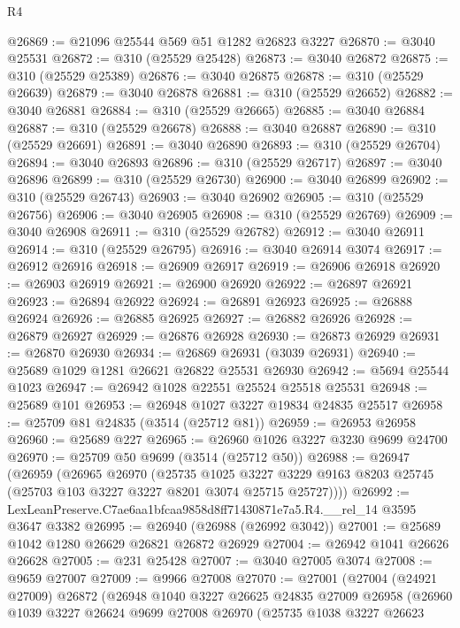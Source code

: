 \begin{lexlean}{R4}
\begin{coremodule}
@26869 := @21096 @25544 @569 @51 @1282 @26823 @3227
@26870 := @3040 @25531
@26872 := @310 (@25529 @25428)
@26873 := @3040 @26872
@26875 := @310 (@25529 @25389)
@26876 := @3040 @26875
@26878 := @310 (@25529 @26639)
@26879 := @3040 @26878
@26881 := @310 (@25529 @26652)
@26882 := @3040 @26881
@26884 := @310 (@25529 @26665)
@26885 := @3040 @26884
@26887 := @310 (@25529 @26678)
@26888 := @3040 @26887
@26890 := @310 (@25529 @26691)
@26891 := @3040 @26890
@26893 := @310 (@25529 @26704)
@26894 := @3040 @26893
@26896 := @310 (@25529 @26717)
@26897 := @3040 @26896
@26899 := @310 (@25529 @26730)
@26900 := @3040 @26899
@26902 := @310 (@25529 @26743)
@26903 := @3040 @26902
@26905 := @310 (@25529 @26756)
@26906 := @3040 @26905
@26908 := @310 (@25529 @26769)
@26909 := @3040 @26908
@26911 := @310 (@25529 @26782)
@26912 := @3040 @26911
@26914 := @310 (@25529 @26795)
@26916 := @3040 @26914 @3074
@26917 := @26912 @26916
@26918 := @26909 @26917
@26919 := @26906 @26918
@26920 := @26903 @26919
@26921 := @26900 @26920
@26922 := @26897 @26921
@26923 := @26894 @26922
@26924 := @26891 @26923
@26925 := @26888 @26924
@26926 := @26885 @26925
@26927 := @26882 @26926
@26928 := @26879 @26927
@26929 := @26876 @26928
@26930 := @26873 @26929
@26931 := @26870 @26930
@26934 := @26869 @26931 (@3039 @26931)
@26940 := @25689 @1029 @1281 @26621 @26822 @25531 @26930
@26942 := @5694 @25544 @1023
@26947 := @26942 @1028 @22551 @25524 @25518 @25531
@26948 := @25689 @101
@26953 := @26948 @1027 @3227 @19834 @24835 @25517
@26958 := @25709 @81 @24835 (@3514 (@25712 @81))
@26959 := @26953 @26958
@26960 := @25689 @227
@26965 := @26960 @1026 @3227 @3230 @9699 @24700
@26970 := @25709 @50 @9699 (@3514 (@25712 @50))
@26988 := @26947
    (@26959
      (@26965
        @26970
        (@25735
          @1025
          @3227
          @3229
          @9163
          @8203
          @25745
          (@25703 @103 @3227 @3227 @8201 @3074 @25715 @25727))))
@26992 := LexLeanPreserve.C7ae6aa1bfcaa9858d8ff71430871e7a5.R4.__rel_14 @3595 @3647 @3382
@26995 := @26940 (@26988 (@26992 @3042))
@27001 := @25689 @1042 @1280 @26629 @26821 @26872 @26929
@27004 := @26942 @1041 @26626 @26628
@27005 := @231 @25428
@27007 := @3040 @27005 @3074
@27008 := @9659 @27007
@27009 := @9966 @27008
@27070 := @27001
    (@27004
      (@24921 @27009)
      @26872
      (@26948
        @1040
        @3227
        @26625
        @24835
        @27009
        @26958
        (@26960
          @1039
          @3227
          @26624
          @9699
          @27008
          @26970
          (@25735
            @1038
            @3227
            @26623

\end{coremodule}
\end{lexlean}
